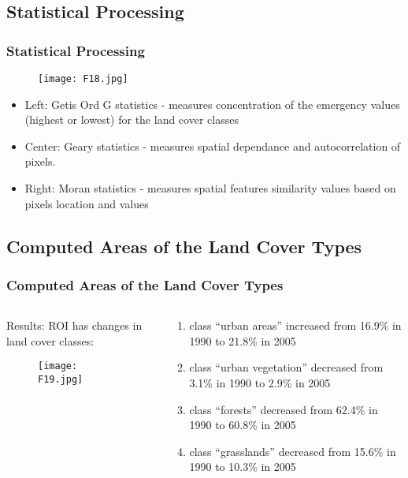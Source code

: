 \documentclass[pdflatex,compress,8pt,
	xcolor={dvipsnames,dvipsnames,svgnames,x11names,table},
	hyperref={	
	breaklinks = true, 
	pdfauthor={Lemenkova Polina}, 
	pdfsubject={Preentation}, 
	pdfcreator={Lemenkova Polina}, 
	pdfproducer={Lemenkova Polina}, 
	colorlinks=true,
	linkcolor=Gold1, 
	citecolor=NavyBlue, 
	urlcolor = NavyBlue, 
	breaklinks = true}]{beamer}
\begin{document}
\subsection{Statistical Processing}
\begin{frame}\frametitle{Statistical Processing}
\begin{figure}[H]
	\centering
		\texttt{[image: F18.jpg]}
\end{figure}
\begin{itemize}
	\item Left: \alert{Getis Ord G statistics} - measures concentration of the emergency values (highest or lowest) for the land cover classes
	\item Center: \alert{Geary statistics} - measures spatial dependance and autocorrelation of pixels.
	\item Right: \alert{Moran statistics} - measures spatial features similarity values based on pixels location and values
\end{itemize}
\end{frame}

\subsection{Computed Areas of the Land Cover Types}
\begin{frame}\frametitle{Computed Areas of the Land Cover Types}
\begin{minipage}[0.5\textheight]{\textwidth}
\begin{columns}[T]
\begin{column}{0.6\textwidth}
Results: ROI has changes in land cover classes: 
\begin{figure}[H]
	\centering
		\texttt{[image: F19.jpg]}
\end{figure}
\end{column}
\begin{column}{0.4\textwidth}

\begin{enumerate}
	\item class “urban areas” increased from 16.9\% in 1990 to 21.8\% in 2005
	\item class “urban vegetation” decreased from 3.1\% in 1990 to 2.9\% in 2005
	\item class “forests” decreased from 62.4\% in 1990 to 60.8\% in 2005
	\item class “grasslands” decreased from 15.6\% in 1990 to 10.3\% in 2005
\end{enumerate}
\end{column}
\end{columns}
\end{minipage}
\end{frame}
\end{document}
